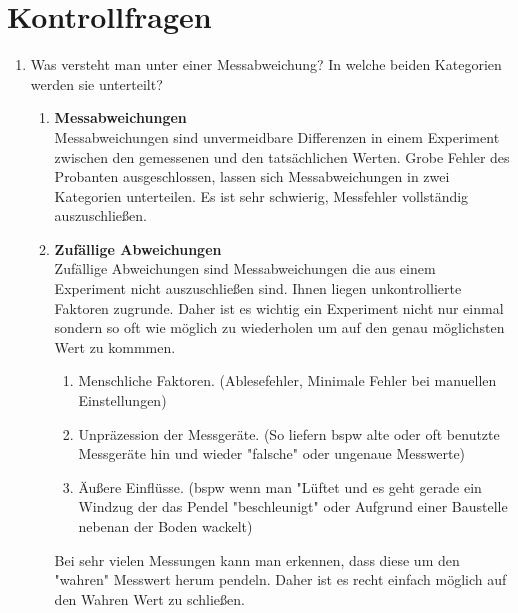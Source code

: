 \documentclass[fleqn,10pt]{olplainarticle}
\begin{document}
\section{Kontrollfragen}
 \begin{enumerate}
     \item Was versteht man unter einer Messabweichung? In welche beiden Kategorien werden sie unterteilt?
    \begin{enumerate}
     \item \textbf{Messabweichungen} \cite{FATU} \\
    Messabweichungen sind unvermeidbare Differenzen in einem Experiment zwischen den gemessenen und den tatsächlichen Werten. Grobe Fehler des Probanten ausgeschlossen, lassen sich Messabweichungen in zwei Kategorien unterteilen. Es ist sehr schwierig, Messfehler vollständig auszuschließen.
        \item \textbf{Zufällige Abweichungen} \cite{FATU} \\
        Zufällige Abweichungen sind Messabweichungen die aus einem Experiment nicht auszuschließen sind. Ihnen liegen unkontrollierte Faktoren zugrunde. Daher ist es wichtig ein Experiment nicht nur einmal sondern so oft wie möglich zu wiederholen um auf den genau möglichsten Wert zu kommmen.
        \begin{enumerate}
            \item Menschliche Faktoren. (Ablesefehler, Minimale Fehler bei manuellen Einstellungen)
            \item Unpräzession der Messgeräte. (So liefern bspw alte oder oft benutzte Messgeräte hin und wieder "falsche" oder ungenaue Messwerte)
            \item Äußere Einflüsse. (bspw wenn man "Lüftet und es geht gerade ein Windzug der das Pendel "beschleunigt" oder Aufgrund einer Baustelle nebenan der Boden wackelt)
        \end{enumerate}
        Bei sehr vielen Messungen kann man erkennen, dass diese um den "wahren" Messwert herum pendeln. Daher ist es recht einfach möglich auf den Wahren Wert zu schließen.
        

\end{enumerate}
\end{enumerate}
\end{document}
